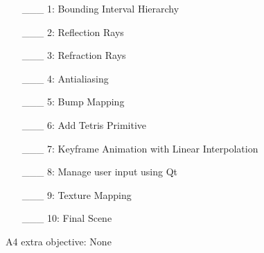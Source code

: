 \documentclass {article}
\begin{document}
\begin{enumerate}
     \item[\_\_\_ 1:]  Bounding Interval Hierarchy

     \item[\_\_\_ 2:]  Reflection Rays

     \item[\_\_\_ 3:]  Refraction Rays

     \item[\_\_\_ 4:]  Antialiasing

     \item[\_\_\_ 5:]  Bump Mapping

     \item[\_\_\_ 6:]  Add Tetris Primitive

     \item[\_\_\_ 7:]  Keyframe Animation with Linear Interpolation

     \item[\_\_\_ 8:]  Manage user input using Qt

     \item[\_\_\_ 9:]  Texture Mapping

     \item[\_\_\_ 10:] Final Scene
\end{enumerate}

A4 extra objective: None
\end{document}
